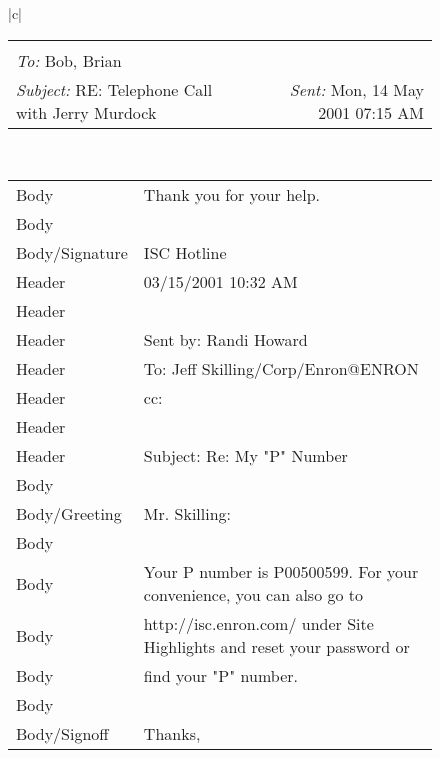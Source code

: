 \documentclass{llncs}
\begin{document}


\begin{figure}
\centering
\begin{tabular}{|c|}
	\hline 
	\scriptsize{
	\begin{tabular*}{\textwidth}{@{\extracolsep{\fill}}lr}
		\makecell{
			\textit{From:} Alice\\ 
			\textit{To:} Bob, Brian\\
			\textit{Subject:} RE: Telephone Call with Jerry Murdock
		} &
		\hspace*{\fill} { \textit{Sent:} Mon, 14 May 2001 07:15 AM}
	\end{tabular*}
}
	\\ 
	\hline 
	\scriptsize{
	\begin{tabular*}{\textwidth}{l|l} 
		Body           & Thank you for your help. \\
		Body           & \\
		Body/Signature & ISC Hotline\\\hline
		Header         & 03/15/2001 10:32 AM \\
		Header         & \\
		Header         & Sent by: Randi Howard \\
		Header         & To: Jeff Skilling/Corp/Enron@ENRON\\
		Header         & cc:\\
		Header         & \\
		Header         & Subject: Re: My "P" Number\\\hline
		Body           & \\
		Body/Greeting  & Mr. Skilling: \\
		Body           & \\
		Body           & Your P number is P00500599.  For your convenience, you can also go to\\
		Body           & http://isc.enron.com/ under Site Highlights and reset your password or \\
		Body           & find your "P" number.\\
		Body           & \\
		Body/Signoff   & Thanks,\\

\end{tabular*}}
\end{tabular}
\end{figure}
\end{document}

